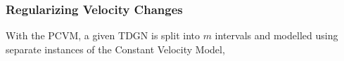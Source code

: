 \subsubsection{Regularizing Velocity Changes}
\label{sec:Method:PiecewiseConstantVModel:Regularization}

With the PCVM, a given TDGN is split into $m$ intervals and modelled using separate instances of the Constant Velocity Model, 



